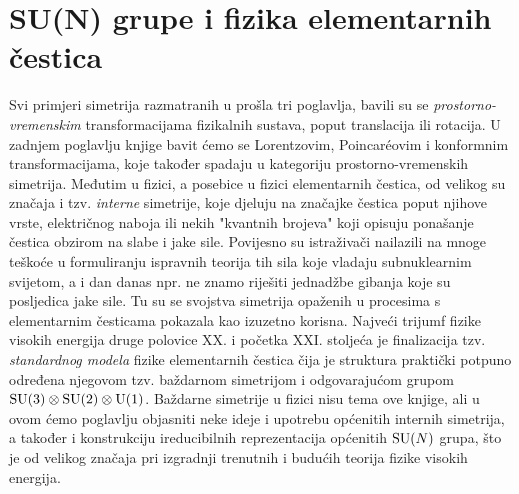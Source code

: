 
\chapter{SU(N) grupe i fizika elementarnih čestica}

Svi primjeri simetrija razmatranih u prošla tri poglavlja,
bavili su se \emph{prostorno-vremenskim} transformacijama fizikalnih
sustava, poput translacija ili rotacija. U zadnjem poglavlju knjige
bavit ćemo se Lorentzovim, Poincar\'{e}ovim i konformnim
transformacijama, koje također spadaju u kategoriju prostorno-vremenskih simetrija.
Međutim u fizici, a posebice u fizici elementarnih čestica,
od velikog su značaja i tzv. \emph{interne} simetrije, koje
djeluju na značajke čestica poput njihove vrste, električnog
naboja ili nekih "kvantnih brojeva" koji opisuju
ponašanje čestica obzirom na  slabe i jake sile.
Povijesno su istraživači nailazili na mnoge teškoće u formuliranju
ispravnih teorija tih sila koje vladaju subnuklearnim svijetom,
a i dan danas npr. ne znamo riješiti jednadžbe
gibanja koje su posljedica jake sile. Tu su se svojstva simetrija
opaženih u procesima s elementarnim česticama pokazala kao izuzetno korisna.
Najveći trijumf fizike visokih energija druge polovice XX. i početka
XXI. stoljeća je finalizacija tzv. \emph{standardnog modela} fizike elementarnih
čestica čija je struktura praktički potpuno određena njegovom
tzv. baždarnom simetrijom i odgovarajućom grupom $\mathrm{SU}(3) \otimes \mathrm{SU}(2) \otimes \mathrm{U}(1)$. 
Baždarne simetrije u fizici nisu tema ove knjige, ali u ovom ćemo poglavlju
objasniti neke ideje i upotrebu općenitih internih simetrija, a također
i konstrukciju ireducibilnih reprezentacija općenitih $\mathrm{SU}(N)$ grupa,
što je od velikog značaja pri izgradnji trenutnih i budućih teorija
fizike visokih energija.



